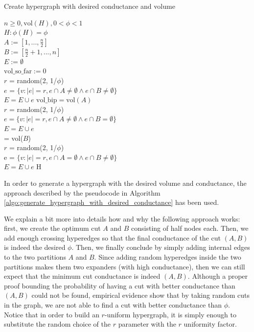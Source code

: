 \documentclass[../main.tex]{subfiles}
\begin{document}
    
    	\begin{algorithm}
    		\label{algo:generate_hypergraph_with_desired_conductance}
    		\caption{Create hypergraph with desired conductance and volume}
    		\SetAlgoLined
    		 $n \geq 0, \text{vol}(H), 0<\phi<1$ \\
    		 $H: \phi(H) = \phi$ \\
    		$A := [1, ..., \frac{n}{2}]$ \\
    		$B := [\frac{n}{2}+1, ..., n]$ \\
    		$E := \emptyset$ \\
    		$\text{vol\_so\_far} := 0$ \\
    		{
    			$r$ = random(2, 1/$\phi$) \\
    			$e$ = $\{v: |e|=r, e\cap A \neq \emptyset \land e\cap B \neq \emptyset\}$ \\ 
    			$E = E \cup e$
    		}
    		$\text{vol\_bip} = \text{vol}(A)$\\
    		{
    			$r$ = random(2, 1/$\phi$) \\
    			$e = \{v: |e|=r, e\cap A \neq \emptyset \land e\cap B = \emptyset\} $\\
    			$E = E \cup e$ \\
    		}
    		 = vol($B$) \\
    		{
    			$r$ = random(2, 1/$\phi$) \\ 
    			e = $\{v: |e|=r, e\cap A = \emptyset \land e\cap B \neq \emptyset\} $ \\
    			$E = E \cup e$
    		}
    		 H     
    	\end{algorithm}
    	
    	
        In order to generate a hypergraph with the desired volume and conductance, the  approach described by the pseudocode in Algorithm \ref{algo:generate_hypergraph_with_desired_conductance} has been used. 
        
        
       
        We explain a bit more into details how and why the following approach works: first, we create the optimum cut $A$ and $B$ consisting of half nodes each. Then, we add enough crossing hyperedges so that the final conductance of the cut $(A,B)$ is indeed the desired $\phi$. Then, we finally conclude by simply adding internal edges to the two partitions $A$ and $B$. Since adding random hyperedges inside the two partitions makes them two expanders (with high conductance), then we can still expect that the minimum cut conductance is indeed $(A,B)$. Although a proper proof bounding the probability of having a cut with better conductance than $(A,B)$ could not be found, empirical evidence show that by taking random cuts in the graph, we are not able to find a cut with better conductance than $\phi$. Notice that in order to build an $r$-uniform hypergraph, it is simply enough to substitute the random choice of the $r$ parameter with the $r$ uniformity factor.
    
\end{document}
